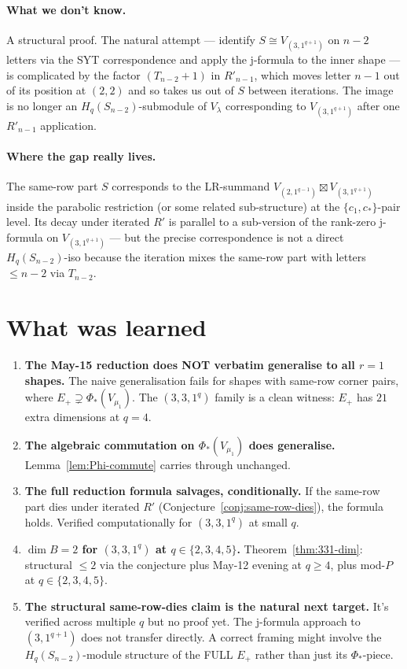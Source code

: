 \documentclass[11pt]{article}
\theoremstyle{definition}
\begin{document}
\paragraph{What we don't know.}
A structural proof. The natural attempt — identify $S \cong V_{(3, 1^{q+1})}$
on $n-2$ letters via the SYT correspondence and apply the j-formula
to the inner shape — is complicated by the factor $(T_{n-2}{+}1)$ in
$R'_{n-1}$, which moves letter $n - 1$ out of its position at $(2, 2)$
and so takes us out of $S$ between iterations. The image is no longer
an $H_q(S_{n-2})$-submodule of $V_\lambda$ corresponding to
$V_{(3, 1^{q+1})}$ after one $R'_{n-1}$ application.

\paragraph{Where the gap really lives.}
The same-row part $S$ corresponds to the LR-summand
$V_{(2, 1^{q-1})} \boxtimes V_{(3, 1^{q+1})}$ inside the parabolic
restriction (or some related sub-structure) at the $\{c_1, c_*\}$-pair
level. Its decay under iterated $R'$ is parallel to a sub-version of
the rank-zero j-formula on $V_{(3, 1^{q+1})}$ — but the precise
correspondence is not a direct $H_q(S_{n-2})$-iso because the iteration
mixes the same-row part with letters $\le n - 2$ via $T_{n-2}$.

\section{What was learned}\label{sec:learned}

\begin{enumerate}[leftmargin=2em,topsep=0.3em,itemsep=0.2em]
\item \textbf{The May-15 reduction does NOT verbatim generalise to all
$r = 1$ shapes.} The naive generalisation fails for shapes with
same-row corner pairs, where $E_+ \supsetneq \Phi_*(V_{\mu_1})$. The
$(3, 3, 1^q)$ family is a clean witness: $E_+$ has $21$ extra
dimensions at $q = 4$.

\item \textbf{The algebraic commutation on $\Phi_*(V_{\mu_1})$ does
generalise.} Lemma~\ref{lem:Phi-commute} carries through unchanged.

\item \textbf{The full reduction formula salvages, conditionally.} If
the same-row part dies under iterated $R'$
(Conjecture~\ref{conj:same-row-dies}), the formula holds. Verified
computationally for $(3, 3, 1^q)$ at small $q$.

\item \textbf{$\dim B = 2$ for $(3, 3, 1^q)$ at $q \in \{2, 3, 4, 5\}$.}
Theorem~\ref{thm:331-dim}: structural $\le 2$ via the conjecture plus
May-12 evening at $q \ge 4$, plus mod-$P$ at $q \in \{2, 3, 4, 5\}$.

\item \textbf{The structural same-row-dies claim is the natural next
target.} It's verified across multiple $q$ but no proof yet. The
j-formula approach to $(3, 1^{q+1})$ does not transfer directly. A
correct framing might involve the $H_q(S_{n-2})$-module structure of
the FULL $E_+$ rather than just its $\Phi_*$-piece.
\end{enumerate}
\end{document}
